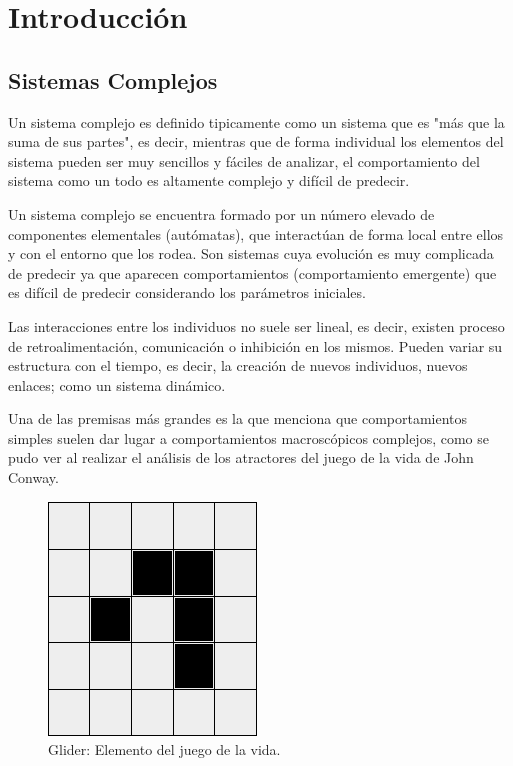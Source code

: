 %
\newpage
\chapter{Introducción}
  \section{Sistemas Complejos}
      Un sistema complejo es definido tipicamente como un sistema que es "más que la suma de sus partes", es decir, mientras que de forma individual los elementos del sistema pueden ser muy sencillos y fáciles de analizar, el comportamiento del sistema como un todo es altamente complejo y difícil de predecir.\cite{3}

      Un sistema complejo se encuentra formado por un número elevado de componentes elementales (autómatas), que interactúan de forma local entre ellos y con el entorno que los rodea. Son sistemas cuya evolución es muy complicada de predecir ya que aparecen comportamientos (comportamiento emergente) que es difícil de predecir considerando los parámetros iniciales.
      
      Las interacciones entre los individuos no suele ser lineal, es decir, existen proceso de retroalimentación, comunicación o inhibición en los mismos. Pueden variar su estructura con el tiempo, es decir, la creación de nuevos individuos, nuevos enlaces; como un sistema dinámico. \cite{1}
      
      Una de las premisas más grandes es la que menciona que comportamientos simples suelen dar lugar a comportamientos macroscópicos complejos, como se pudo ver al realizar el análisis de los atractores del juego de la vida de John Conway.\cite{2}

      \begin{figure}[h!]
        \centering
          \includegraphics[scale=0.4]{./images/glider}
          \caption{Glider: Elemento del juego de la vida.} 
      \end{figure}

